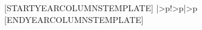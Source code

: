 \def\[INSERTFILENAME]Columns{
|>{\raggedright\arraybackslash\leavevmode}p{\WorPTtitleWidth}%
|>{\leavevmode}l%
[INSERTYEARCOLUMNS]%
|}

[STARTYEARCOLUMNSTEMPLATE]
|>{\columncolor{[INSERTYEARCOLOR]}\centering\arraybackslash\leavevmode}p{\WorPTnumberWidth}!{\NasaTotalRule}>{\columncolor{[INSERTYEARCOLOR]}\centering\arraybackslash\leavevmode}p{\WorPTnumberWidth}|>{\columncolor{[INSERTYEARCOLOR]}\centering\arraybackslash\leavevmode}p{\WorPTnumberWidth}
[ENDYEARCOLUMNSTEMPLATE]

\]
